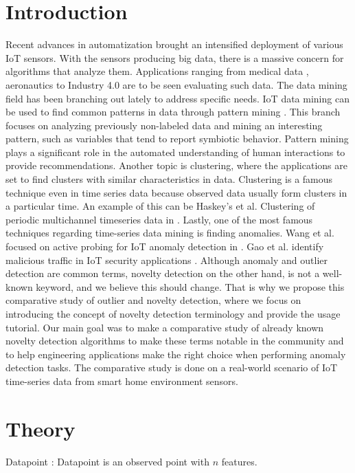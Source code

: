 \documentclass[preprint,12pt]{elsarticle}
\begin{document}

\section{Introduction}
\label{sec:sample1}

Recent advances in automatization brought an intensified deployment of various IoT sensors.
With the sensors producing big data, there is a massive concern for algorithms that analyze them.
Applications ranging from medical data \cite{AMINIZADEH2023107745}, aeronautics \cite{eddarhri2022towards}
to Industry 4.0 \cite{regona2022artificial} are to be seen evaluating such data.
The data mining field has been branching out lately to address specific needs.
IoT data mining can be used to find common patterns in data through pattern mining \cite{yasir2022performing}.
This branch focuses on analyzing previously non-labeled data and mining an interesting pattern, such as variables that tend to report symbiotic behavior.
Pattern mining plays a significant role in the automated understanding of human interactions to provide recommendations.
Another topic is clustering, where the applications are set to find clusters with similar characteristics in data.
Clustering is a famous technique even in time series data because observed data usually form clusters in a particular time.
An example of this can be Haskey's et al. Clustering of periodic multichannel timeseries data in \cite{haskey2014clustering}.
Lastly, one of the most famous techniques regarding time-series data mining is finding anomalies.
Wang et al. focused on active probing for IoT anomaly detection in \cite{wang2023intelligent}.
Gao et al. identify malicious traffic in IoT security applications \cite{gao2023anomaly}.
Although anomaly and outlier detection are common terms, novelty detection on the other hand, is not a well-known keyword, and we believe this should change.
That is why we propose this comparative study of outlier and novelty detection, where we focus on introducing the concept of novelty detection terminology and provide the usage tutorial.
Our main goal was to make a comparative study of already known novelty detection algorithms to make these terms notable in the community and to help engineering applications make the right choice when performing anomaly detection tasks.
The comparative study is done on a real-world scenario of IoT time-series data from smart home environment sensors.

\section{Theory}
Datapoint
: Datapoint is an observed point with $n$ features.
\end{document}
